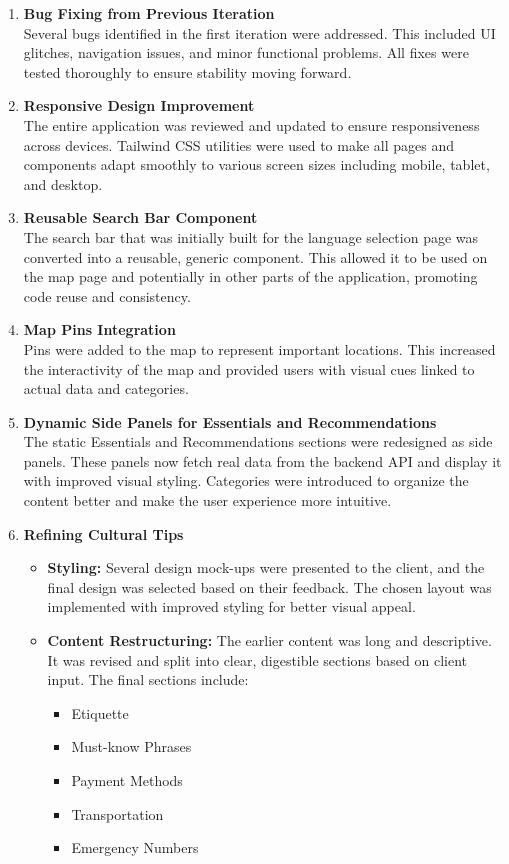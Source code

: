 \begin{enumerate}
    \item \textbf{Bug Fixing from Previous Iteration} \\
    Several bugs identified in the first iteration were addressed. This included UI glitches, navigation issues, and minor functional problems. All fixes were tested thoroughly to ensure stability moving forward.
    \item \textbf{Responsive Design Improvement} \\
    The entire application was reviewed and updated to ensure responsiveness across devices. Tailwind CSS utilities were used to make all pages and components adapt smoothly to various screen sizes including mobile, tablet, and desktop.
    \item \textbf{Reusable Search Bar Component} \\
    The search bar that was initially built for the language selection page was converted into a reusable, generic component. This allowed it to be used on the map page and potentially in other parts of the application, promoting code reuse and consistency.
    \item \textbf{Map Pins Integration} \\
    Pins were added to the map to represent important locations. This increased the interactivity of the map and provided users with visual cues linked to actual data and categories.
    \item \textbf{Dynamic Side Panels for Essentials and Recommendations} \\
    The static Essentials and Recommendations sections were redesigned as side panels. These panels now fetch real data from the backend API and display it with improved visual styling. Categories were introduced to organize the content better and make the user experience more intuitive.
    \item \textbf{Refining Cultural Tips}
    \begin{itemize}
        \item \textbf{Styling:} Several design mock-ups were presented to the client, and the final design was selected based on their feedback. The chosen layout was implemented with improved styling for better visual appeal.
        \item \textbf{Content Restructuring:} The earlier content was long and descriptive. It was revised and split into clear, digestible sections based on client input. The final sections include:
        \begin{itemize}
            \item Etiquette
            \item Must-know Phrases
            \item Payment Methods
            \item Transportation
            \item Emergency Numbers
        \end{itemize}
    \end{itemize}
\end{enumerate}

